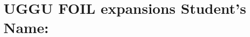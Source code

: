 \documentclass[12pt, a4paper, addpoints]{exam}
\newcommand{\gap}{\vspace{19mm}}
\newcommand{\Gap}{\vspace{38mm}}
\newcommand{\Gap}{\vspace{36mm}}
\newcommand{\uggu}{%
    \pgfmathtruncatemacro{\a}{random(2,9)} %
    \pgfmathtruncatemacro{\b}{random(2,9)} %
    \edef\result{(x + \a)(\b x +1 )}%
    \result
}
\begin{document}
\section*{UGGU  FOIL expansions  \quad Student's Name: \underline{\hspace{5cm}}} 


\begin{questions}
\LARGE

\question
\gap
  
\setlength{\columnsep}{20pt}
\begin{multicols}{3}

\begin{parts}
    \part \( \uggu \)
      \Gap
       \part \( \uggu \)
    \Gap
       \part \( \uggu \)
    \Gap
       \part \( \uggu \)
    \Gap
       \part \( \uggu \)
    \Gap
       \part \( \uggu \)
    \Gap
       \part \( \uggu \)
    \Gap
       \part \( \uggu \)
    \Gap
       \part \( \uggu \)
    \Gap
           \part \( \uggu \)
    \Gap

\end{parts}
\end{multicols}
\end{questions}
\end{document}
